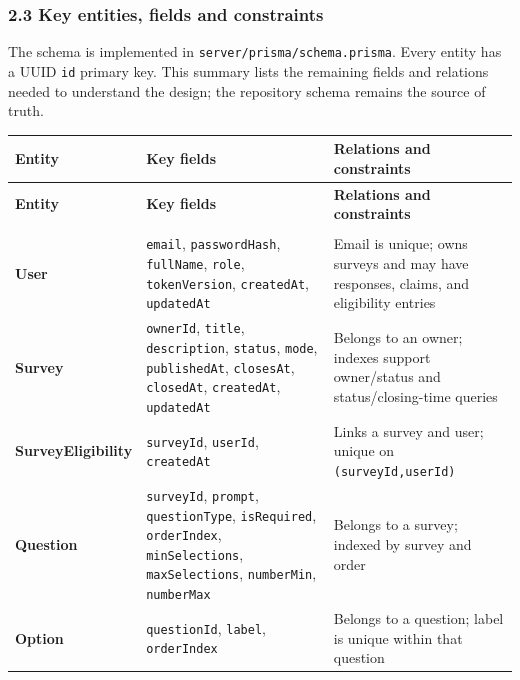 \documentclass[12pt,a4paper]{article}
\begin{document}
\subsubsection*{2.3 Key entities, fields and constraints}
The schema is implemented in \texttt{server/prisma/schema.prisma}. Every entity has a UUID \texttt{id} primary key. This summary lists the remaining fields and relations needed to understand the design; the repository schema remains the source of truth.

{\setlength{\tabcolsep}{3pt}\renewcommand{\arraystretch}{1.08}\scriptsize
\begin{longtable}{@{}>{\raggedright\arraybackslash}p{}>{\raggedright\arraybackslash}p{}>{\raggedright\arraybackslash}p{}@{}}
\toprule
\textbf{Entity} & \textbf{Key fields} & \textbf{Relations and constraints} \\
\midrule
\endfirsthead
\toprule
\textbf{Entity} & \textbf{Key fields} & \textbf{Relations and constraints} \\
\midrule
\endhead
\midrule
\multicolumn{3}{r}{\footnotesize\textit{Continued on next page}}\\
\endfoot
\bottomrule
\endlastfoot
\textbf{User} & \texttt{email}, \texttt{passwordHash}, \texttt{fullName}, \texttt{role}, \texttt{tokenVersion}, \texttt{createdAt}, \texttt{updatedAt} & Email is unique; owns surveys and may have responses, claims, and eligibility entries \\
\textbf{Survey} & \texttt{ownerId}, \texttt{title}, \texttt{description}, \texttt{status}, \texttt{mode}, \texttt{publishedAt}, \texttt{closesAt}, \texttt{closedAt}, \texttt{createdAt}, \texttt{updatedAt} & Belongs to an owner; indexes support owner/status and status/closing-time queries \\
\textbf{SurveyEligibility} & \texttt{surveyId}, \texttt{userId}, \texttt{createdAt} & Links a survey and user; unique on \texttt{(surveyId,userId)} \\
\textbf{Question} & \texttt{surveyId}, \texttt{prompt}, \texttt{questionType}, \texttt{isRequired}, \texttt{orderIndex}, \texttt{minSelections}, \texttt{maxSelections}, \texttt{numberMin}, \texttt{numberMax} & Belongs to a survey; indexed by survey and order \\
\textbf{Option} & \texttt{questionId}, \texttt{label}, \texttt{orderIndex} & Belongs to a question; label is unique within that question \\

\end{longtable}}
\end{document}
